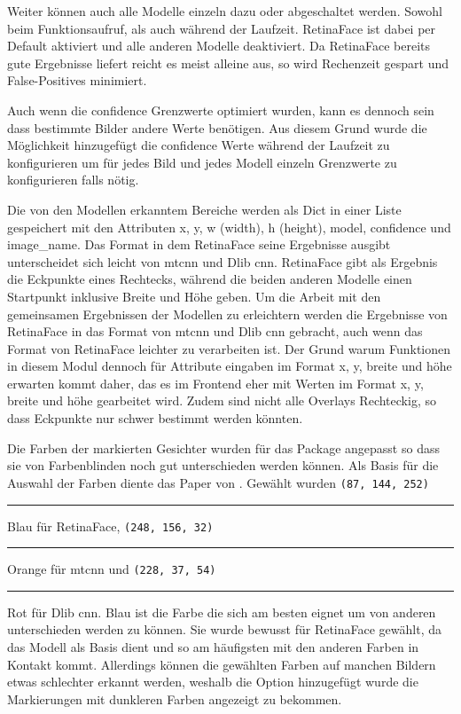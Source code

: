 Weiter können auch alle Modelle einzeln dazu oder abgeschaltet werden. Sowohl beim Funktionsaufruf, als auch während der Laufzeit. RetinaFace ist dabei per Default aktiviert und alle anderen Modelle deaktiviert. Da RetinaFace bereits gute Ergebnisse liefert reicht es meist alleine aus, so wird Rechenzeit gespart und False-Positives minimiert.

Auch wenn die confidence Grenzwerte optimiert wurden, kann es dennoch sein dass bestimmte Bilder andere Werte benötigen. Aus diesem Grund wurde die Möglichkeit hinzugefügt die confidence Werte während der Laufzeit zu konfigurieren um für jedes Bild und jedes Modell einzeln Grenzwerte zu konfigurieren falls nötig.

Die von den Modellen erkanntem Bereiche werden als Dict in einer Liste gespeichert mit den Attributen x, y, w (width), h (height), model, confidence und image\_name. Das Format in dem RetinaFace seine Ergebnisse ausgibt unterscheidet sich leicht von \gls{mtcnn} und Dlib \gls{cnn}. RetinaFace gibt als Ergebnis die Eckpunkte eines Rechtecks, während die beiden anderen Modelle einen Startpunkt inklusive Breite und Höhe geben. Um die Arbeit mit den gemeinsamen Ergebnissen der Modellen zu erleichtern werden die Ergebnisse von RetinaFace in das Format von \gls{mtcnn} und Dlib \gls{cnn} gebracht, auch wenn das Format von RetinaFace leichter zu verarbeiten ist. Der Grund warum Funktionen in diesem Modul dennoch für Attribute eingaben im Format x, y, breite und höhe erwarten kommt daher, das es im Frontend eher mit Werten im Format x, y, breite und höhe gearbeitet wird. Zudem sind nicht alle Overlays Rechteckig, so dass Eckpunkte nur schwer bestimmt werden könnten.

Die Farben der markierten Gesichter wurden für das Package angepasst so dass sie von Farbenblinden noch gut unterschieden werden können. Als Basis für die Auswahl der Farben diente das Paper von \cite{abs-2107-02270}. Gewählt wurden \texttt{(87, 144, 252)} \textcolor{PetroffBlue}{\rule{1em}{1em}} Blau für RetinaFace, \texttt{(248, 156, 32)} \textcolor{PetroffOrange}{\rule{1em}{1em}} Orange für \gls{mtcnn} und \texttt{(228, 37, 54)} \textcolor{PetroffRed}{\rule{1em}{1em}} Rot für Dlib \gls{cnn}. Blau ist die Farbe die sich am besten eignet um von anderen unterschieden werden zu können. Sie wurde bewusst für RetinaFace gewählt, da das Modell als Basis dient und so am häufigsten mit den anderen Farben in Kontakt kommt. Allerdings können die gewählten Farben auf manchen Bildern etwas schlechter erkannt werden, weshalb die Option hinzugefügt wurde die Markierungen mit dunkleren Farben angezeigt zu bekommen.

